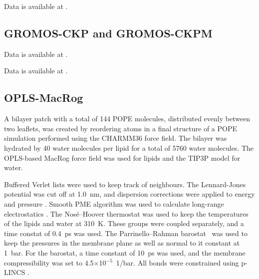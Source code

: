 \documentclass[journal=jpcbfk]{achemso}
\begin{document}
 Data is available at \cite{OPLSuaWvdWPOPEfiles}. 

\subsection{GROMOS-CKP and GROMOS-CKPM}

 Data is available at \cite{gromosCKPpopeT310}. 


 Data is available at \cite{gromosCKPdppe}. 

 

 

\subsection{OPLS-MacRog}

 A bilayer patch with a total of 144 POPE molecules, distributed evenly between two leaflets, was created by reordering atoms in a final structure of a POPE simulation performed using the CHARMM36 force field. The bilayer was hydrated by 40 water molecules per lipid for a total of 5760 water molecules. The OPLS-based MacRog force field was used \cite{Kulig15b} for lipids and the TIP3P model \cite{jorgensen83} for water. 

Buffered Verlet lists \cite{Pall13} were used to keep track of neighbours. The Lennard-Jones potential was cut off at 1.0~nm, and dispersion corrections were applied to energy and pressure \cite{shirts07}. Smooth PME algorithm was used to calculate long-range electrostatics \cite{darden93,essman95}. The Nos\'{e}--Hoover thermostat was used to keep the temperatures of the lipids and water at 310~K. These groups were coupled separately, and a time constat of 0.4~ps was used. The Parrinello--Rahman barostat~\cite{parrinello81} was used to keep the pressures in the membrane plane as well as normal to it constant at 1~bar. For the barostat, a time constant of 10~ps was used, and the membrane compressibility was set to 4.5$\times$10$^{-5}$~1/bar. All bonds were constrained using p-LINCS \cite{hess97,hess07}.
\end{document}
